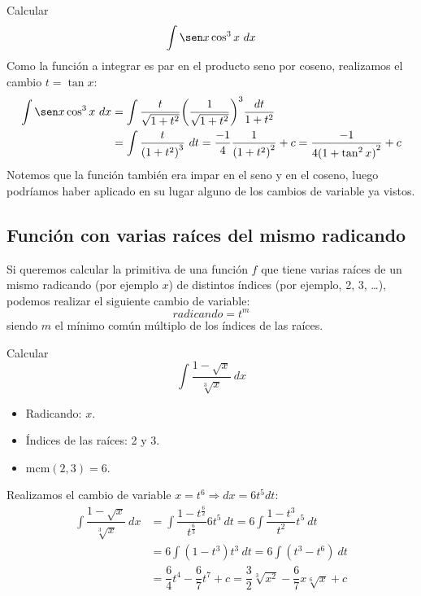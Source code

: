\begin{ejemplo}
    Calcular
    \begin{equation*}
        \displaystyle\int \sen x\cos^3x~dx 
    \end{equation*}
    Como la función a integrar es par en el producto seno por coseno, realizamos el cambio $t=\tan x$:
    \begin{align*}
        \displaystyle\int \sen x\cos^3x~dx &= \displaystyle\int \dfrac{t}{\sqrt{1+t^2}}{\left(\dfrac{1}{\sqrt{1+t^2}}\right)}^{3}\dfrac{dt}{1+t^2} \\
                                           &= \displaystyle\int \dfrac{t}{{(1+t^2)}^{3}}~dt  = \dfrac{-1}{4}\dfrac{1}{{(1+t^2)}^{2}} + c = \dfrac{-1}{4{(1+\tan^2x)}^{2}} + c
    \end{align*}
Notemos que la función también era impar en el seno y en el coseno, luego podríamos haber aplicado en su lugar alguno de los cambios de variable ya vistos.
\end{ejemplo}

\subsection{Función con varias raíces del mismo radicando}
Si queremos calcular la primitiva de una función $f$ que tiene varias raíces de un mismo radicando (por ejemplo $x$) de distintos índices (por ejemplo, 2, 3, \ldots), podemos realizar el siguiente cambio de variable:
\begin{equation*}
    radicando = t^m
\end{equation*}
siendo $m$ el mínimo común múltiplo de los índices de las raíces.

\begin{ejemplo}
    Calcular
    \begin{equation*}
        \displaystyle\int \dfrac{1-\sqrt{x}}{\sqrt[3]{x}}~dx 
    \end{equation*}
    \begin{itemize}
        \item Radicando: $x$.
        \item Índices de las raíces: 2 y 3.
        \item mcm$(2,3)=6$.
    \end{itemize}
    Realizamos el cambio de variable $x = t^6 \Longrightarrow dx = 6t^5dt$:
    \begin{align*}
        \displaystyle\int \dfrac{1-\sqrt{x}}{\sqrt[3]{x}}~dx &= \displaystyle\int \dfrac{1-t^{\frac{6}{2}}}{t^{\frac{6}{3}}}6t^5~dt = 6\displaystyle\int \dfrac{1-t^3}{t^2}t^5~dt \\
                                                             &= 6\displaystyle\int (1-t^3)t^3~dt = 6\displaystyle\int (t^3 - t^6)~dt \\
                                                             &= \dfrac{6}{4}t^4 - \dfrac{6}{7}t^7 + c = \dfrac{3}{2}\sqrt[3]{x^2}- \dfrac{6}{7}x\sqrt[6]{x} + c
    \end{align*}
\end{ejemplo}

